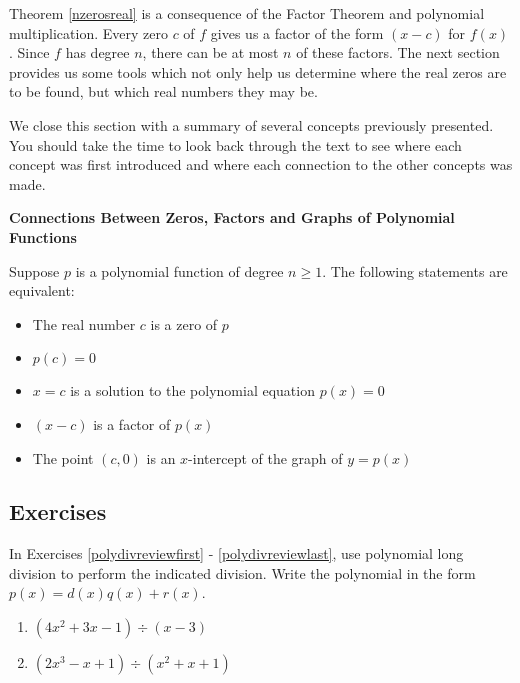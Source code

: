 \medskip

Theorem \ref{nzerosreal} is a consequence of the Factor Theorem and polynomial multiplication.  Every zero $c$ of $f$ gives us a factor of the form $(x-c)$ for $f(x)$.  Since $f$ has degree $n$, there can be at most $n$ of these factors.  The next section provides us some tools which not only help us determine where the real zeros are to be found, but which real numbers they may be.

\medskip

We close this section with a summary of several concepts previously presented.  You should take the time to look back through the text to see where each concept was first introduced and where each connection to the other concepts was made.

\medskip

\colorbox{ResultColor}{\bbm

\centerline{\textbf{Connections Between Zeros, Factors and Graphs of Polynomial Functions}}

\medskip

\hspace{.17in} Suppose $p$ is a polynomial function of degree $n \geq 1$.  The following statements are equivalent:

\begin{itemize}

\item The real number $c$ is a zero of $p$
\item $p(c) = 0$
\item $x = c$ is a solution to the polynomial equation $p(x) = 0$
\item $(x - c)$ is a factor of $p(x)$
\item The point $(c, 0)$ is an $x$-intercept of the graph of $y = p(x)$

\end{itemize}

\ebm}

\newpage

\subsection{Exercises}

In Exercises \ref{polydivreviewfirst} - \ref{polydivreviewlast}, use polynomial long division to perform the indicated division.  Write the polynomial in the form $p(x) = d(x)q(x) + r(x)$.

\begin{multicols}{2}
\begin{enumerate}

\item $\left(4x^2+3x-1 \right) \div (x-3)$ \label{polydivreviewfirst}
\item $\left(2x^3-x+1 \right) \div \left(x^{2} +x+1 \right)$ 

\setcounter{HW}{\value{enumi}}
\end{enumerate}
\end{multicols}

